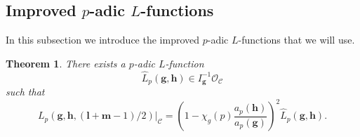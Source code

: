 \documentclass[a4paper,11pt]{amsart}
\theoremstyle{plain}
\newtheorem{theorem}{Theorem}[section]
\theoremstyle{definition}
\theoremstyle{remark}
\newcommand{\cl}{\mathcal}
\newcommand{\hg}{{\mathbf{g}}}
\newcommand{\hh}{{\mathbf h}}
\numberwithin{equation}{section}
\begin{document}

\subsection{Improved $p$-adic $L$-functions}

In this subsection we introduce the improved $p$-adic $L$-functions that we will use.


\begin{theorem}\label{thm:improvedHRpadicLfunction}
    There exists a $p$-adic $L$-function
    \[
    \widehat{L}_p(\hg,\hh)\in I_{\hg}^{-1}\cl{O}_{\cl{C}}
    \]
    such that
    \[
    L_p(\hg,\hh,(\mathbf{l}+\mathbf{m}-1)/2)\vert_{\cl{C}}=\left(1-\chi_g(p)\frac{a_p(\hh)}{a_p(\hg)}\right)^2 \widehat{L}_p(\hg,\hh).
    \]
\end{theorem}
\end{document}
